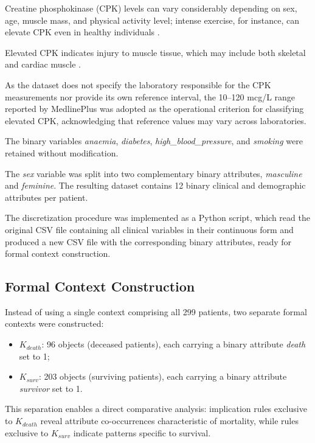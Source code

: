 \documentclass[a4paper,twoside]{article}
\begin{document}
Creatine phosphokinase (CPK) levels can vary considerably depending on sex, age, muscle mass, and physical activity level; intense exercise, for instance, can elevate CPK even in healthy individuals \cite{MedlinePlusCPK}.

Elevated CPK indicates injury to muscle tissue, which may include both skeletal and cardiac muscle \cite{PRCardio}.

As the dataset does not specify the laboratory responsible for the CPK measurements nor provide its own reference interval, the 10--120 mcg/L range reported by MedlinePlus was adopted as the operational criterion for classifying elevated CPK, acknowledging that reference values may vary across laboratories.

The binary variables \textit{anaemia}, \textit{diabetes}, \textit{high\_blood\_pressure}, and \textit{smoking} were retained without modification.

The \textit{sex} variable was split into two complementary binary attributes, \textit{masculine} and \textit{feminine}. The resulting dataset contains 12 binary clinical and demographic attributes per patient.

The discretization procedure was implemented as a Python script, which read the original CSV file containing all clinical variables in their continuous form and produced a new CSV file with the corresponding binary attributes, ready for formal context construction.



\subsection{Formal Context Construction}

Instead of using a single context comprising all 299 patients, two separate formal contexts were constructed:

\begin{itemize}
    \item $K_{death}$: 96 objects (deceased patients), each carrying a binary attribute \textit{death} set to 1;
    \item $K_{surv}$: 203 objects (surviving patients), each carrying a binary attribute \textit{survivor} set to 1.
\end{itemize}

This separation enables a direct comparative analysis: implication rules exclusive to $K_{death}$ reveal attribute co-occurrences characteristic of mortality, while rules exclusive to $K_{surv}$ indicate patterns specific to survival.
\end{document}
